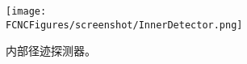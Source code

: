 \begin{figure}[htb]
\centering
\texttt{[image: \\FCNCFigures/screenshot/InnerDetector.png]}
\caption{内部径迹探测器。}
\label{fig:InnerDetector}
\end{figure}